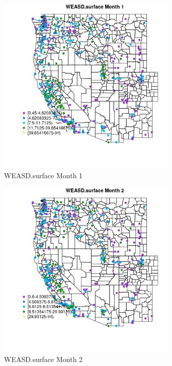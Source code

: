 \begin{figure} 
\centering  
\includegraphics[width=0.77\textwidth]{Code_Outputs/ML_input_report_ML_input_PM25_Step5_part_d_de_duplicated_aves_ML_input_MapObsMo1WEASDsurface.jpg} 
\caption{\label{fig:ML_input_report_ML_input_PM25_Step5_part_d_de_duplicated_aves_ML_inputMapObsMo1WEASDsurface}WEASD.surface Month 1} 
\end{figure} 
 

\begin{figure} 
\centering  
\includegraphics[width=0.77\textwidth]{Code_Outputs/ML_input_report_ML_input_PM25_Step5_part_d_de_duplicated_aves_ML_input_MapObsMo2WEASDsurface.jpg} 
\caption{\label{fig:ML_input_report_ML_input_PM25_Step5_part_d_de_duplicated_aves_ML_inputMapObsMo2WEASDsurface}WEASD.surface Month 2} 
\end{figure} 
 

